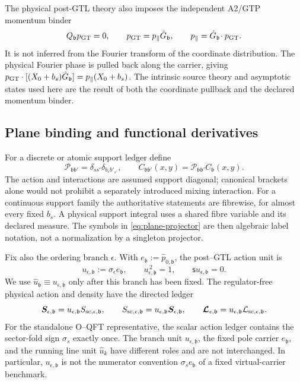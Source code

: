 \documentclass[final,5p,times,twocolumn,numbers,nopreprintline]{elsarticle}
\numberwithin{equation}{section}
\theoremstyle{definition}
\theoremstyle{remark}
\newcommand{\bb}{\mathfrak b}
\newcommand{\BR}{\mathsf s}
\newcommand{\vct}[1]{\boldsymbol{#1}}
\newcommand{\ee}{e_{\bb}}
\begin{document}
The physical post-GTL theory also imposes the independent A2/GTP
momentum binder
\begin{equation}
 Q_{\bb}p_{\rm GT}=0,\qquad
 p_{\rm GT}=p_\parallel\hat G_{\bb},\qquad
 p_\parallel=\hat G_{\bb}\!\cdot p_{\rm GT}.
 \label{eq:independent-momentum-binder}
\end{equation}
It is not inferred from the Fourier transform of the coordinate
distribution. The physical Fourier phase is pulled back along the
carrier, giving
\(p_{\rm GT}\cdot[(X_0+b_s)\hat G_{\bb}]
=p_\parallel(X_0+b_s)\).
The intrinsic source theory and asymptotic states used here are the
result of both the coordinate pullback and the declared momentum binder.

\subsection{Plane binding and functional derivatives}

For a discrete or atomic support ledger define
\begin{equation}
 \mathcal P_{\bb\bb'}=\delta_{ss'}\delta_{b_s b'_{s'}},
 \qquad
 C_{\bb\bb'}(x,y)=\mathcal P_{\bb\bb'}C_{\bb}(x,y).
 \label{eq:plane-projector}
\end{equation}
The action and interactions are assumed support diagonal; canonical
brackets alone would not prohibit a separately introduced mixing
interaction. For a continuous support family the authoritative
statements are fibrewise, for almost every fixed \(b_s\). A physical
support integral uses a shared fibre variable and its declared
measure. The symbols in \eqref{eq:plane-projector} are then algebraic
label notation, not a normalization by a singleton projector.

Fix also the ordering branch \(\epsilon\). With
\(\ee:=\hat p_{0,\bb}\), the post--GTL action unit is
\begin{equation}
 u_{\epsilon,\bb}:=\sigma_\epsilon\ee,\qquad
 u_{\epsilon,\bb}^{\,2}=1,\qquad
 \BR u_{\epsilon,\bb}=0.
 \label{eq:action-branch-unit}
\end{equation}
We use \(\hat u_{\bb}\equiv u_{\epsilon,\bb}\) only after this
branch has been fixed. The regulator-free physical action and density
have the directed ledger
\begin{equation}
 \vct S_{\epsilon,\bb}
   =u_{\epsilon,\bb}S_{{\rm sc},\epsilon,\bb},\qquad
 S_{{\rm sc},\epsilon,\bb}
   =u_{\epsilon,\bb}\vct S_{\epsilon,\bb},\qquad
 \vct{\mathcal L}_{\epsilon,\bb}
   =u_{\epsilon,\bb}\mathcal L_{{\rm sc},\epsilon,\bb}.
 \label{eq:directed-action}
\end{equation}
For the standalone O--QFT representative, the scalar action ledger
contains the sector-fold sign \(\sigma_s\) exactly once. The branch
unit \(u_{\epsilon,\bb}\), the fixed pole carrier \(\ee\), and the
running line unit \(\widehat u_k\) have different roles and are not
interchanged. In particular, \(u_{\epsilon,\bb}\) is not the
numerator convention \(\sigma_s\ee\) of a fixed virtual-carrier
benchmark.
\end{document}
